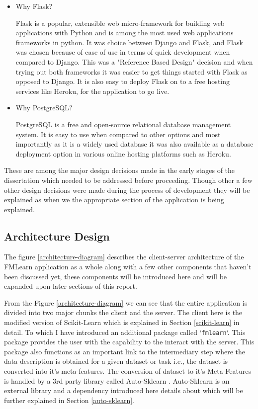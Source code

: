 \begin{itemize}
    \item Why Flask?
    
    Flask is a popular, extensible web micro-framework for building web applications with Python \citep{flask} and is among the most used web applications frameworks in python. It was choice between Django and Flask, and Flask was chosen because of ease of use in terms of quick development when compared to Django. This was a "Reference Based Design" decision and when trying out both frameworks it was easier to get things started with Flask as opposed to Django. It is also easy to deploy Flask on to a free hosting services like Heroku, for the application to go live.
    
    \item Why PostgreSQL?
    
    PostgreSQL is a free and open-source relational database management system. It is easy to use when compared to other options and most importantly as it is a widely used database it was also available as a database deployment option in various online hosting platforms such as Heroku.
    
\end{itemize}

These are among the major design decisions made in the early stages of the dissertation which needed to be addressed before proceeding. Though other a few other design decisions were made during the process of development they will be explained as when we the appropriate section of the application is being explained.

\subsection{Architecture Design}
\label{architecture}

The figure \ref{architecture-diagram} describes the client-server architecture of the FMLearn application as a whole along with a few other components that haven't been discussed yet, these components will be introduced here and will be expanded upon later sections of this report. 

From the Figure \ref{architecture-diagram} we can see that the entire application is divided into two major chunks the client and the server. The client here is the modified version of Scikit-Learn which is explained in Section \ref{scikit-learn} in detail. To which I have introduced an additional package called `\texttt{fmlearn}`. This package provides the user with the capability to the interact with the server. This package also functions as an important link to the intermediary step where the data description is obtained for a given dataset or task i.e., the dataset is converted into it's meta-features. The conversion of dataset to it's Meta-Features is handled by a 3rd party library called Auto-Sklearn \citep{feurer:m}. Auto-Sklearn is an external library and a dependency introduced here details about which will be further explained in Section \ref{auto-sklearn}.

